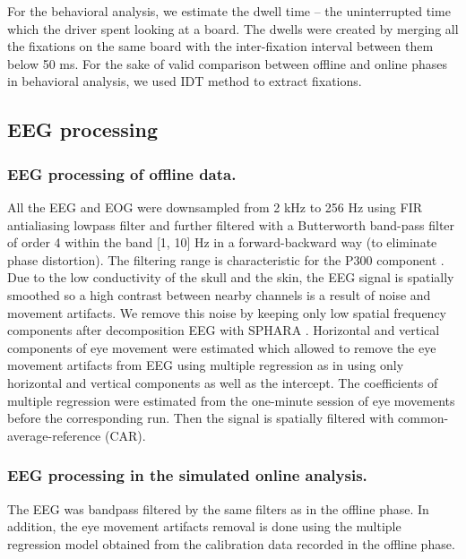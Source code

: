 \documentclass[12pt]{iopart}
\begin{document}
For the behavioral analysis, we estimate 
the dwell time -- the uninterrupted time which the driver spent looking at a board.
The dwells were created
by merging all the fixations on the same board with the inter-fixation interval 
between them below 50 ms.
For the sake of valid comparison between offline and online phases 
in behavioral analysis, we used IDT method to extract fixations.



\subsection{EEG processing}
\subsubsection*{EEG processing of offline data.}
All the EEG and EOG were downsampled from 2 kHz to 256 Hz
using FIR antialiasing lowpass filter
and further filtered  with a Butterworth band-pass filter
of order 4 within the band [1, 10] Hz  in a forward-backward way (to eliminate phase distortion).
The filtering range is characteristic for the P300 component \cite{demiralp_wavelet_2001}.
Due to the low conductivity of the skull and the skin,
the EEG signal is spatially smoothed so a high contrast between nearby channels
is a result of noise and movement artifacts. We remove this noise
by keeping only low spatial frequency components after decomposition EEG with SPHARA \cite{graichen_sphara_2015}.
Horizontal and vertical components of eye movement were estimated which allowed
to remove the eye movement artifacts from EEG using multiple regression 
as in \cite{schlogl_fully_2007} using only horizontal and vertical 
components as well as the intercept.
The coefficients of multiple regression were estimated from the 
one-minute session of eye movements before the corresponding run.
Then the signal is spatially
filtered with common-average-reference (CAR). 

\subsubsection*{EEG processing in the simulated online analysis.}
The EEG was  bandpass filtered by the same filters as in the offline phase. In addition, the eye movement artifacts removal is done using the multiple regression model obtained from the calibration data recorded in the offline phase.
\end{document}
